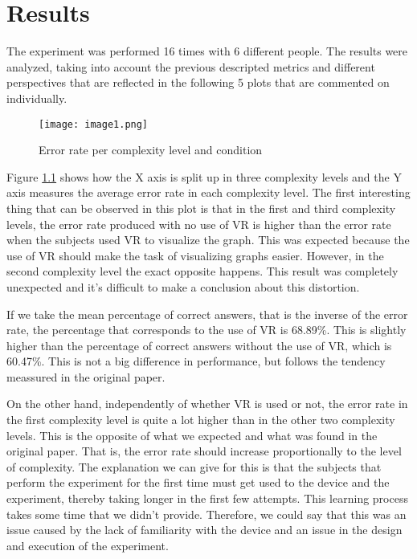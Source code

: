 \chapter{Results}

The experiment was performed 16 times with 6 different people. The
results were analyzed, taking into account the previous descripted metrics
and different perspectives that are reflected in the following 5
plots that are commented on individually.

\begin{figure}[!ht]
\centering
\texttt{[image: image1.png]}
\caption{Error rate per complexity level and condition} \label{fig:plot1}
\end{figure}

Figure \ref{fig:plot1} shows how the X axis is split up in three complexity
levels and the Y axis measures the average error rate in each complexity
level. The first interesting thing that can be observed in this plot is
that in the first and third complexity levels, the error rate produced
with no use of VR is higher than the error rate when the subjects used
VR to visualize the graph. This was expected because the use of VR
should make the task of visualizing graphs easier. However, in the
second complexity level the exact opposite happens. This result was
completely unexpected and it's difficult to make a conclusion about this
distortion.

If we take the mean percentage of correct answers, that is the
inverse of the error rate, the percentage that corresponds to the use of
VR is 68.89\%. This is slightly higher than the percentage of correct
answers without the use of VR, which is 60.47\%. This is not a big
difference in performance, but follows the tendency meassured in the
original paper.

On the other hand, independently of whether VR is used or not, the error rate in the
first complexity level is quite a lot higher than in the other two complexity
levels. This is the opposite of what we expected and what was found in
the original paper. That is, the error rate should increase
proportionally to the level of complexity. The explanation we can give for
this is that the subjects that perform the experiment for the first time
must get used to the device and the experiment, thereby taking longer in the first few attempts. This learning process takes some time that we didn't provide. Therefore, we could say
that this was an issue caused by the lack of familiarity with the device
and an issue in the design and execution of the experiment.

